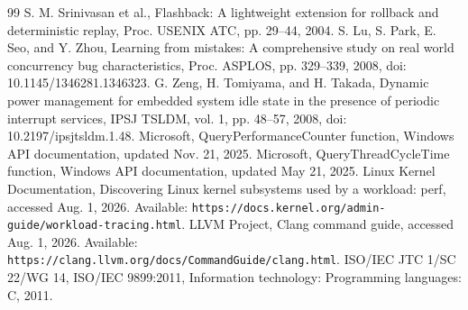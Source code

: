 \begin{thebibliography}{99}
S. M. Srinivasan et al., Flashback: A lightweight extension for rollback and deterministic replay, Proc. USENIX ATC, pp. 29--44, 2004.
S. Lu, S. Park, E. Seo, and Y. Zhou, Learning from mistakes: A comprehensive study on real world concurrency bug characteristics, Proc. ASPLOS, pp. 329--339, 2008, doi: 10.1145/1346281.1346323.
G. Zeng, H. Tomiyama, and H. Takada, Dynamic power management for embedded system idle state in the presence of periodic interrupt services, IPSJ TSLDM, vol. 1, pp. 48--57, 2008, doi: 10.2197/ipsjtsldm.1.48.
Microsoft, QueryPerformanceCounter function, Windows API documentation, updated Nov. 21, 2025.
Microsoft, QueryThreadCycleTime function, Windows API documentation, updated May 21, 2025.
Linux Kernel Documentation, Discovering Linux kernel subsystems used by a workload: perf, accessed Aug. 1, 2026. Available: \texttt{https://docs.kernel.org/admin-guide/workload-tracing.html}.
LLVM Project, Clang command guide, accessed Aug. 1, 2026. Available: \texttt{https://clang.llvm.org/docs/CommandGuide/clang.html}.
ISO/IEC JTC 1/SC 22/WG 14, ISO/IEC 9899:2011, Information technology: Programming languages: C, 2011.
\end{thebibliography}


